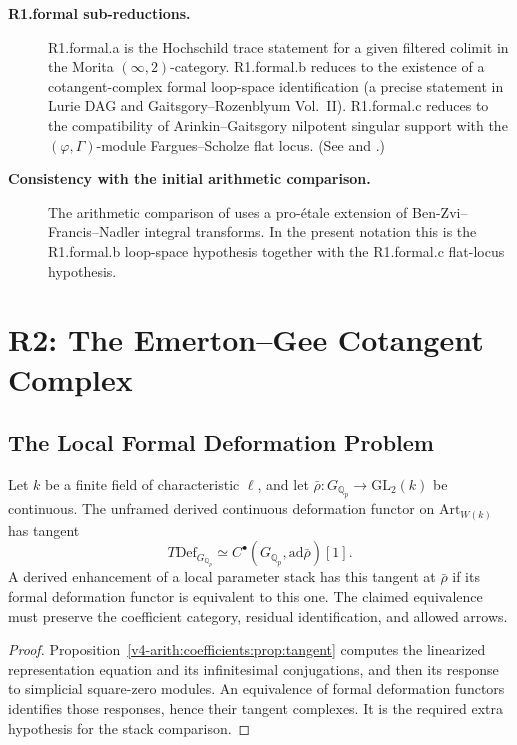 \begin{description}
\item[\textbf{R1.formal sub-reductions.}]
R1.formal.a is the Hochschild trace statement for a given filtered
colimit in the Morita \((\infty,2)\)-category.
R1.formal.b reduces to the existence of a cotangent-complex formal
loop-space identification (a precise statement in Lurie DAG and
Gaitsgory--Rozenblyum Vol.~II). R1.formal.c reduces to the
compatibility of Arinkin--Gaitsgory nilpotent singular support with
the \((\varphi,\Gamma)\)-module Fargues--Scholze flat locus.
(See  and
.)

\item[\textbf{Consistency with the initial arithmetic comparison.}]
The arithmetic comparison of 
uses a pro-\'etale extension of Ben-Zvi--Francis--Nadler integral
transforms. In the present notation this is the R1.formal.b
loop-space hypothesis together with the R1.formal.c flat-locus
hypothesis.
\end{description}

\section{R2: The Emerton--Gee Cotangent Complex}
\label{v4-arith:bzn-sub:R2}

\subsection{The Local Formal Deformation Problem}

\begin{proposition}
\label{v4-arith:bzn-sub:prop:EG-tangent-local}
Let \(k\) be a finite field of characteristic \(\ell\), and let
\(\bar\rho:G_{\mathbb Q_p}\to\mathrm{GL}_2(k)\) be continuous.
The unframed derived continuous deformation functor on
\(\mathrm{Art}_{W(k)}\) has tangent
\[
 T\mathrm{Def}_{G_{\mathbb Q_p}}
 \simeq C^\bullet(G_{\mathbb Q_p},\mathrm{ad}\bar\rho)[1].
\]
A derived enhancement of a local parameter stack has this tangent at
\(\bar\rho\) if its formal deformation functor is equivalent to
this one. The claimed equivalence must preserve the coefficient
category, residual identification, and allowed arrows.
\end{proposition}
\begin{proof}
Proposition~\ref{v4-arith:coefficients:prop:tangent} computes the
linearized representation equation and its infinitesimal conjugations,
and then its response to simplicial square-zero modules. An equivalence
of formal deformation functors identifies those responses, hence their
tangent complexes. It is the required extra hypothesis for the stack
comparison.
\end{proof}

